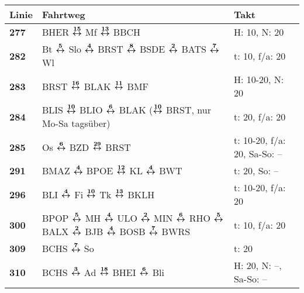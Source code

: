 \begin{minipage}[t]{0.45\textwidth}
\begin{tabular}{>{\bfseries}L{1.2cm}L{9.0cm}L{3.0cm}}
{\bfseries Linie} & {\bfseries Fahrtweg} & {\bfseries Takt} \\
\hline
\bus{} 277    & BHER $\boldsymbol{\overset{15}{\leftrightarrow}}$ Mf $\boldsymbol{\overset{13}{\leftrightarrow}}$ BBCH                                                                                                                              & H: 10, N: 20               \\
\bus{} 282    & Bt $\boldsymbol{\overset{5}{\leftrightarrow}}$ Slo $\boldsymbol{\overset{4}{\leftrightarrow}}$ BRST $\boldsymbol{\overset{8}{\leftrightarrow}}$ BSDE $\boldsymbol{\overset{2}{\leftrightarrow}}$ BATS $\boldsymbol{\overset{7}{\leftrightarrow}}$ Wl                                                                                & t: 10, f/a: 20             \\
\bus{} 283    & BRST $\boldsymbol{\overset{16}{\leftrightarrow}}$ BLAK $\boldsymbol{\overset{11}{\leftrightarrow}}$ BMF                                                                                                                             & H: 10-20, N: 20            \\
\bus{} 284    & BLIS $\boldsymbol{\overset{10}{\leftrightarrow}}$ BLIO $\boldsymbol{\overset{6}{\leftrightarrow}}$ BLAK ($\boldsymbol{\overset{10}{\leftrightarrow}}$ BRST, nur Mo-Sa tagsüber)                                                                                     & t: 20, f/a: 20             \\
\bus{} 285    & Os $\boldsymbol{\overset{6}{\leftrightarrow}}$ BZD $\boldsymbol{\overset{29}{\leftrightarrow}}$ BRST                                                                                                                                & t: 10-20, f/a: 20, Sa-So: -- \\
\bus{} 291    & BMAZ $\boldsymbol{\overset{4}{\leftrightarrow}}$ BPOE $\boldsymbol{\overset{12}{\leftrightarrow}}$ KL $\boldsymbol{\overset{4}{\leftrightarrow}}$ BWT                                                                                                               & t: 20, So: --              \\
\bus{} 296    & BLI $\boldsymbol{\overset{4}{\leftrightarrow}}$ Fi $\boldsymbol{\overset{10}{\leftrightarrow}}$ Tk $\boldsymbol{\overset{13}{\leftrightarrow}}$ BKLH                                                                                                                & t: 10-20, f/a: 20          \\
\bus{} 300    & BPOP $\boldsymbol{\overset{5}{\leftrightarrow}}$ MH $\boldsymbol{\overset{4}{\leftrightarrow}}$ ULO $\boldsymbol{\overset{2}{\leftrightarrow}}$ MIN $\boldsymbol{\overset{6}{\leftrightarrow}}$ RHO $\boldsymbol{\overset{5}{\leftrightarrow}}$ BALX $\boldsymbol{\overset{2}{\leftrightarrow}}$ BJB $\boldsymbol{\overset{4}{\leftrightarrow}}$ BOSB $\boldsymbol{\overset{7}{\leftrightarrow}}$ BWRS                              & t: 10, f/a: 20             \\
\bus{} 309    & BCHS $\boldsymbol{\overset{7}{\leftrightarrow}}$ So                                                                                                                                                 & t: 20                      \\
\bus{} 310    & BCHS $\boldsymbol{\overset{3}{\leftrightarrow}}$ Ad $\boldsymbol{\overset{18}{\leftrightarrow}}$ BHEI $\boldsymbol{\overset{6}{\leftrightarrow}}$ Bli                                                                                                               & H: 20, N: --, Sa-So: --    \\
\hline
\end{tabular}
\end{minipage}
